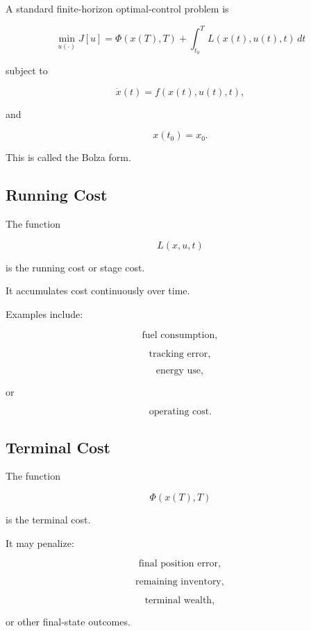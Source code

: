 A standard finite-horizon optimal-control problem is

\[
\boxed{
\min_{u(\cdot)}
J[u]
=
\Phi
(
x(T),
T
)
+
\int_{t_0}^{T}
L
(
x(t),
u(t),
t
)
\,dt
}
\]

subject to

\[
\boxed{
\dot{x}(t)
=
f
(
x(t),
u(t),
t
),
}
\]

and

\[
\boxed{
x(t_0)=x_0.
}
\]

This is called the Bolza form.

\subsection{Running Cost}
\label{subsec:running-cost}

The function

\[
\boxed{
L(x,u,t)
}
\]

is the running cost or stage cost.

It accumulates cost continuously over time.

Examples include:

\[
\boxed{
\text{fuel consumption},
}
\]

\[
\boxed{
\text{tracking error},
}
\]

\[
\boxed{
\text{energy use},
}
\]

or

\[
\boxed{
\text{operating cost}.
}
\]

\subsection{Terminal Cost}
\label{subsec:terminal-cost}

The function

\[
\boxed{
\Phi(x(T),T)
}
\]

is the terminal cost.

It may penalize:

\[
\boxed{
\text{final position error},
}
\]

\[
\boxed{
\text{remaining inventory},
}
\]

\[
\boxed{
\text{terminal wealth},
}
\]

or other final-state outcomes.

